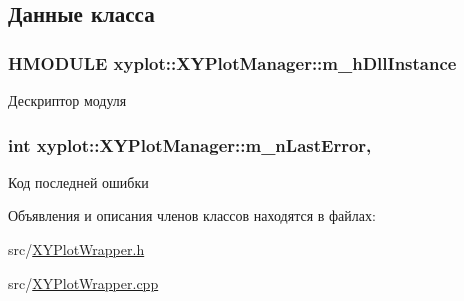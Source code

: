 \subsection{Данные класса}
\hypertarget{classxyplot_1_1_x_y_plot_manager_a1ddc519fd38e08cba67f11f4d2fad942}{
\subsubsection[{m\-\_\-h\-Dll\-Instance}]{\setlength{\rightskip}{0pt plus 5cm}H\-M\-O\-D\-U\-L\-E xyplot\-::\-X\-Y\-Plot\-Manager\-::m\-\_\-h\-Dll\-Instance\hspace{0.3cm}{\ttfamily [protected]}}}\label{classxyplot_1_1_x_y_plot_manager_a1ddc519fd38e08cba67f11f4d2fad942}


Дескриптор модуля 

\hypertarget{classxyplot_1_1_x_y_plot_manager_ac842be5823171dc50111c6c4c62f1311}{
\subsubsection[{m\-\_\-n\-Last\-Error}]{\setlength{\rightskip}{0pt plus 5cm}int xyplot\-::\-X\-Y\-Plot\-Manager\-::m\-\_\-n\-Last\-Error\hspace{0.3cm}{\ttfamily [mutable]}, {\ttfamily [protected]}}}\label{classxyplot_1_1_x_y_plot_manager_ac842be5823171dc50111c6c4c62f1311}


Код последней ошибки 



Объявления и описания членов классов находятся в файлах\-:\begin{DoxyCompactItemize}
\item 
src/\hyperlink{_x_y_plot_wrapper_8h}{X\-Y\-Plot\-Wrapper.\-h}\item 
src/\hyperlink{_x_y_plot_wrapper_8cpp}{X\-Y\-Plot\-Wrapper.\-cpp}\end{DoxyCompactItemize}
